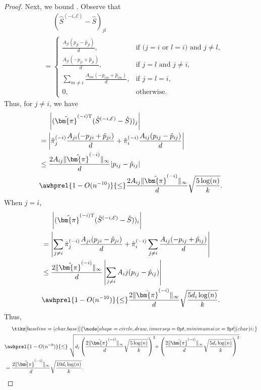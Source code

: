 \documentclass[sigconf,nonacm,pbalance]{acmart}
\newcommand{\tran}{{\mathrm{T}}}
\newcommand{\circled}[1]{
    \tikz[baseline=(char.base)]{\node[shape=circle, draw, inner sep=0pt,minimum size=9pt] (char) {#1};}
}
\begin{document}
\begin{proof}
Next, we bound \circled{i}. Observe that
\begin{align}
    &\phantom{{}={}} (\hat{S}^{(-i,\mathcal{E})}-\hat{S})_{jl} \\
    &= \begin{cases}
        \frac{A_{jl}(p_{jl}-\hat{p}_{jl})}{d}, & \text{if (} j=i \text{ or } l=i \text{) and } j\neq l, \\
        \frac{A_{ji}(-p_{ji}+\hat{p}_{ji})}{d}, & \text{if } j=l \text{ and } j\neq i, \\
        \sum_{m\neq i}\frac{A_{im}(-p_{im}+\hat{p}_{im})}{d}, &\text{if } j=l=i, \\
        0, & \text{otherwise}.
    \end{cases}
\end{align}
Thus, for $j\neq i$, we have
\begin{align}
&\phantom{{}={}} \left|(\hat{\bm{\pi}}^{(-i)\tran} (\hat{S}^{(-i,\mathcal{E})}-\hat{S}))_j\right| \\
&= \left|\hat{\pi}^{(-i)}_j \frac{A_{ji}(-p_{ji}+\hat{p}_{ji})}{d} + \hat{\pi}^{(-i)}_i \frac{A_{ij}(p_{ij}-\hat{p}_{ij})}{d}\right| \\
&\leq \frac{2A_{ij} \|\hat{\bm{\pi}}^{(-i)}\|_\infty}{d} |p_{ij}- \hat{p}_{ij}| \\
&\awhprel{1-O(n^{-10})}{\leq} \frac{2A_{ij}\|\hat{\bm{\pi}}^{(-i)}\|_\infty}{d} \sqrt{\frac{5\log(n)}{k}}.
\end{align}
When $j=i$,
\begin{align}
&\phantom{{}={}} \left|(\hat{\bm{\pi}}^{(-i)\tran} (\hat{S}^{(-i,\mathcal{E})}-\hat{S}))_i\right| \\
&= \left|\sum_{j\neq i} \hat{\pi}^{(-i)}_j \frac{A_{ji}(p_{ji}-\hat{p}_{ji})}{d} + \hat{\pi}^{(-i)}_i \sum_{j\neq i} \frac{A_{ij}(-p_{ij}+\hat{p}_{ij})}{d}\right| \\
&\leq \frac{2 \|\hat{\bm{\pi}}^{(-i)}\|_\infty}{d} \left|\sum_{j\neq i} A_ij(p_{ij}-\hat{p}_{ij})\right| \\
&\awhprel{1-O(n^{-10})}{\leq} \frac{2 \|\hat{\bm{\pi}}^{(-i)}\|_\infty}{d} \sqrt{\frac{5d_i\log(n)}{k}}.
\end{align}
Thus,
\begin{align}
    &\phantom{{}={}}\circled{i} \\
    &\awhprel{1-O(n^{-9})}{\leq} \  \sqrt{d_i \left(\frac{2\|\hat{\bm{\pi}}^{(-i)}\|_\infty}{d} \sqrt{\frac{5\log(n)}{k}}\right)^2\!\! + \left(\frac{2 \|\hat{\bm{\pi}}^{(-i)}\|_\infty}{d} \sqrt{\frac{5d_i\log(n)}{k}}\right)^2}\\
    &= \frac{2\|\hat{\bm{\pi}}^{(-i)}\|_\infty}{d} \sqrt{\frac{10d_i\log(n)}{k}}.
\end{align}


\end{proof}
\end{document}
